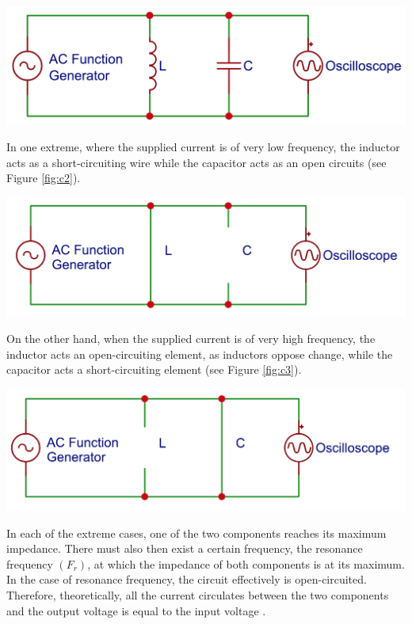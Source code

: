 \documentclass[journal]{IEEEtran}
\begin{document}
\begingroup
    \centering
    \medskip
    \includegraphics[width=\columnwidth]{images/lab5_6.png}
    \label{fig:c1}
    \medskip
\endgroup

\noindent In one extreme, where the supplied current is of very low frequency, the inductor acts as a short-circuiting wire while the capacitor acts as an open circuits (see Figure \ref{fig:c2}). 

\begingroup
    \centering
    \medskip
    \includegraphics[width=\columnwidth]{images/lab5_8.png}
    \label{fig:c2}
    \medskip
\endgroup

\noindent On the other hand, when the supplied current is of very high frequency, the inductor acts an open-circuiting element, as inductors oppose change, while the capacitor acts a short-circuiting element (see Figure \ref{fig:c3}).

\begingroup
    \centering
    \medskip
    \includegraphics[width=\columnwidth]{images/lab5_9.png}
    \label{fig:c3}
    \medskip
\endgroup

\noindent In each of the extreme cases, one of the two components reaches its maximum impedance. There must also then exist a certain frequency, the resonance frequency $(F_{r})$, at which the impedance of both components is at its maximum. In the case of resonance frequency, the circuit effectively is open-circuited. Therefore, theoretically, all the current circulates between the two components and the output voltage is equal to the input voltage \cite{equations}.\\
\end{document}
